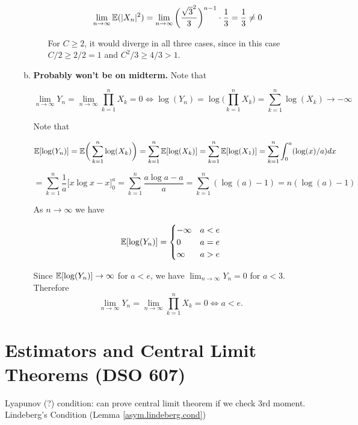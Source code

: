 \begin{enumerate}[(1)]
\begin{enumerate}[(a)]
\begin{enumerate}[(i)]
\[
\lim_{n \to \infty} \mathbb{E}(|X_n|^2) = \lim_{n \to \infty} \bigg( \frac{\sqrt{3}^2}{3}\bigg)^{n-1} \cdot \frac{1}{3} = \frac{1}{3} \neq 0
\]

For \(C \geq 2\), it would diverge in all three cases, since in this case \(C/2 \geq 2/2 = 1\) and \(C^2/3 \geq 4/3 > 1\).

\end{enumerate}

\item \textbf{Probably won't be on midterm.} Note that 

\[
\lim_{n \to \infty} Y_n = \lim_{n \to \infty} \prod_{k=1}^n X_k = 0 \iff \log(Y_n) = \log \bigg( \prod_{k=1}^n X_k\bigg) = \sum_{k=1}^n \log (X_k) \to -\infty
\]

Note that

\[
\mathbb{E}[ \log(Y_n)] = \mathbb{E} \bigg(  \sum_{k=1}^n \log (X_k) \bigg) = \sum_{k=1}^n \mathbb{E}[\log(X_k)] = \sum_{k=1}^n \mathbb{E}[\log(X_1)] = \sum_{k=1}^n \int_0^a ( \log(x) /a) dx
\]

\[
=  \sum_{k=1}^n \frac{1}{a} \big[x \log x - x \big]_0^a =  \sum_{k=1}^n \frac{a \log a - a}{a} =  \sum_{k=1}^n ( \log(a) - 1) =n(\log(a) - 1)
\]

As \(n \to \infty\) we have

\[
\mathbb{E}[ \log(Y_n)]  = \begin{cases}
-\infty & a < e \\ 
0 & a = e \\ 
\infty & a > e 
\end{cases}
\]

Since \(\mathbb{E}[ \log(Y_n)] \to \infty\) for \(a < e\), we have \(\lim_{n \to \infty} Y_n = 0\) for \(a < 3\). Therefore \[\boxed{\lim_{n \to \infty}Y_n = \lim_{n \to \infty} \prod_{k=1}^n X_k = 0 \iff a < e.}\]


\end{enumerate}

\end{enumerate}

\section{Estimators and Central Limit Theorems (DSO 607)}

Lyapunov (?) condition: can prove central limit theorem if we check 3rd moment. Lindeberg's Condition (Lemma \ref{asym.lindeberg.cond})

%
%
%
%
%
%
%
%

%
%
%